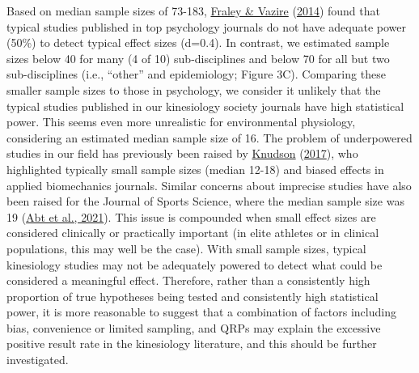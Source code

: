 \documentclass[]{cik}%
\begin{document}
Based on median sample sizes of 73-183,
\protect\hyperlink{ref-fraley2014}{Fraley \& Vazire}
(\protect\hyperlink{ref-fraley2014}{2014}) found that typical studies
published in top psychology journals do not have adequate power (50\%)
to detect typical effect sizes (d=0.4). In contrast, we estimated sample
sizes below 40 for many (4 of 10) sub-disciplines and below 70 for all
but two sub-disciplines (i.e., ``other'' and epidemiology; Figure 3C).
Comparing these smaller sample sizes to those in psychology, we consider
it unlikely that the typical studies published in our kinesiology
society journals have high statistical power. This seems even more
unrealistic for environmental physiology, considering an estimated
median sample size of 16. The problem of underpowered studies in our
field has previously been raised by
\protect\hyperlink{ref-knudson2017}{Knudson}
(\protect\hyperlink{ref-knudson2017}{2017}), who highlighted typically
small sample sizes (median 12-18) and biased effects in applied
biomechanics journals. Similar concerns about imprecise studies have
also been raised for the Journal of Sports Science, where the median
sample size was 19 (\protect\hyperlink{ref-abt2021}{Abt et al., 2021}).
This issue is compounded when small effect sizes are considered
clinically or practically important (in elite athletes or in clinical
populations, this may well be the case). With small sample sizes,
typical kinesiology studies may not be adequately powered to detect what
could be considered a meaningful effect. Therefore, rather than a
consistently high proportion of true hypotheses being tested and
consistently high statistical power, it is more reasonable to suggest
that a combination of factors including bias, convenience or limited
sampling, and QRPs may explain the excessive positive result rate in the
kinesiology literature, and this should be further investigated.
\end{document}
